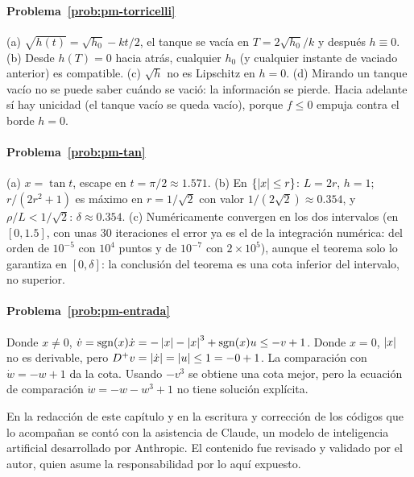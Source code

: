 \paragraph{Problema~\ref{prob:pm-torricelli}}
(a) $\sqrt{h(t)}=\sqrt{h_0}-kt/2$, el tanque se vacía en $T=2\sqrt{h_0}/k$ y después $h\equiv0$. (b) Desde $h(T)=0$ hacia atrás, cualquier $h_0$ (y cualquier instante de vaciado anterior) es compatible. (c) $\sqrt h$ no es Lipschitz en $h=0$. (d) Mirando un tanque vacío no se puede saber cuándo se vació: la información se pierde. Hacia adelante sí hay unicidad (el tanque vacío se queda vacío), porque $f\le0$ empuja contra el borde $h=0$.

\paragraph{Problema~\ref{prob:pm-tan}}
(a) $x=\tan t$, escape en $t=\pi/2\approx1.571$. (b) En $\{\left\lvert x\right\rvert\le r\}$: $L=2r$, $h=1$; $r/(2r^2+1)$ es máximo en $r=1/\sqrt2$ con valor $1/(2\sqrt2)\approx0.354$, y $\rho/L<1/\sqrt2$: $\delta\approx0.354$. (c) Numéricamente convergen en los dos intervalos (en $[0,1.5]$, con unas $30$ iteraciones el error ya es el de la integración numérica: del orden de $10^{-5}$ con $10^4$ puntos y de $10^{-7}$ con $2\times10^5$), aunque el teorema solo lo garantiza en $[0,\delta]$: la conclusión del teorema es una cota inferior del intervalo, no superior.

\paragraph{Problema~\ref{prob:pm-entrada}}
Donde $x\neq0$, $\dot v=\operatorname{sgn}(x)\dot x=-\left\lvert x\right\rvert-\left\lvert x\right\rvert^3+\operatorname{sgn}(x)u\le-v+1$. Donde $x=0$, $\left\lvert x\right\rvert$ no es derivable, pero $D^+v=\left\lvert \dot x\right\rvert=\left\lvert u\right\rvert\le1=-0+1$. La comparación con $\dot w=-w+1$ da la cota. Usando $-v^3$ se obtiene una cota mejor, pero la ecuación de comparación $\dot w=-w-w^3+1$ no tiene solución explícita.

\respuestaspausas

\begin{parallevar}
En la redacción de este capítulo y en la escritura y corrección de los códigos que lo acompañan se contó con la asistencia de Claude, un modelo de inteligencia artificial desarrollado por Anthropic. El contenido fue revisado y validado por el autor, quien asume la responsabilidad por lo aquí expuesto.
\end{parallevar}
